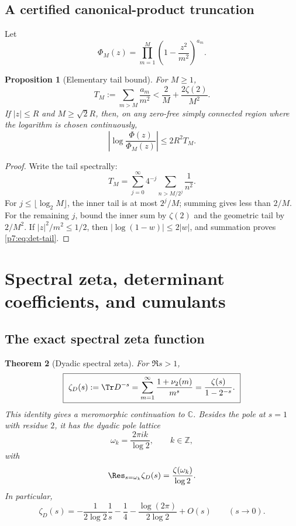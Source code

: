 \documentclass[11pt]{article}
\numberwithin{equation}{section}
\newtheorem{theorem}{Theorem}[section]
\newtheorem{proposition}[theorem]{Proposition}
\theoremstyle{definition}
\theoremstyle{remark}
\newcommand{\Z}{\mathbb Z}
\newcommand{\C}{\mathbb C}
\begin{document}
\subsection{A certified canonical-product truncation}

Let
\[
 \Phi_M(z)=\prod_{m=1}^{M}\left(1-\frac{z^2}{m^2}\right)^{a_m}.
\]

\begin{proposition}[Elementary tail bound]\label{p7:prop:tail}
For $M\ge1$,
\begin{equation}\label{p7:eq:trace-tail}
 T_M:=\sum_{m>M}\frac{a_m}{m^2}
 <\frac2M+\frac{2\zeta(2)}{M^2}.
\end{equation}
If $|z|\le R$ and $M\ge\sqrt2R$, then, on any zero-free simply connected region where the logarithm is chosen continuously,
\begin{equation}\label{p7:eq:det-tail}
 \left|\log\frac{\Phi(z)}{\Phi_M(z)}\right|
 \le2R^2T_M.
\end{equation}
\end{proposition}

\begin{proof}
Write the tail spectrally:
\[
 T_M=\sum_{j=0}^{\infty}4^{-j}
 \sum_{n>M/2^j}\frac1{n^2}.
\]
For $j\le\lfloor\log_2M\rfloor$, the inner tail is at most $2^j/M$; summing gives less than $2/M$.  For the remaining $j$, bound the inner sum by $\zeta(2)$ and the geometric tail by $2/M^2$.  If $|z|^2/m^2\le1/2$, then $|\log(1-w)|\le2|w|$, and summation proves \cref{p7:eq:det-tail}.
\end{proof}

\section{Spectral zeta, determinant coefficients, and cumulants}

\subsection{The exact spectral zeta function}

\begin{theorem}[Dyadic spectral zeta]\label{p7:thm:zetaD}
For $\Re s>1$,
\begin{equation}\label{p7:eq:zetaD}
 \boxed{\ \zeta_D(s):=\Tr D^{-s}
 =\sum_{m=1}^{\infty}\frac{1+\nu_2(m)}{m^s}
 =\frac{\zeta(s)}{1-2^{-s}}.\ }
\end{equation}
This identity gives a meromorphic continuation to $\C$.  Besides the pole at $s=1$ with residue $2$, it has the dyadic pole lattice
\begin{equation}\label{p7:eq:omega}
 \omega_k=\frac{2\pi i k}{\log2},\qquad k\in\Z,
\end{equation}
with
\begin{equation}\label{p7:eq:zetaD-res}
 \Res_{s=\omega_k}\zeta_D(s)=\frac{\zeta(\omega_k)}{\log2}.
\end{equation}
In particular,
\begin{equation}\label{p7:eq:zetaD-zeroexp}
 \zeta_D(s)=-\frac{1}{2\log2}\frac1s
 -\frac14-\frac{\log(2\pi)}{2\log2}+O(s)
 \qquad(s\to0).
\end{equation}
\end{theorem}
\end{document}

